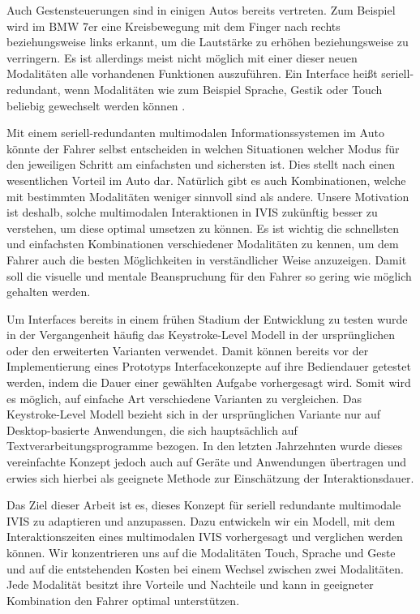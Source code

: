 Auch Gestensteuerungen sind in einigen Autos bereits vertreten.
Zum Beispiel wird im BMW 7er eine Kreisbewegung mit dem Finger nach rechts beziehungsweise links erkannt, um die Lautstärke zu erhöhen beziehungsweise zu verringern. 
Es ist allerdings meist nicht möglich mit einer dieser neuen Modalitäten alle vorhandenen Funktionen auszuführen.
Ein Interface heißt seriell-redundant, wenn Modalitäten wie zum Beispiel Sprache, Gestik oder Touch beliebig gewechselt werden können \citep{neuss_2001}. 

Mit einem seriell-redundanten multimodalen Informationssystemen im Auto könnte der Fahrer selbst entscheiden in welchen Situationen welcher Modus für den jeweiligen Schritt am einfachsten und sichersten ist.
Dies stellt nach \citet{Muller_2011} einen wesentlichen Vorteil im Auto dar.
Natürlich gibt es auch Kombinationen, welche mit bestimmten Modalitäten weniger sinnvoll sind als andere.
Unsere Motivation ist deshalb, solche multimodalen Interaktionen in IVIS zukünftig besser zu verstehen, um diese optimal umsetzen zu können.
Es ist wichtig die schnellsten und einfachsten Kombinationen verschiedener Modalitäten zu kennen, um dem Fahrer auch die besten Möglichkeiten in verständlicher Weise anzuzeigen.
Damit soll die visuelle und mentale Beanspruchung für den Fahrer so gering wie möglich gehalten werden. 

Um Interfaces bereits in einem frühen Stadium der Entwicklung zu testen wurde in der Vergangenheit häufig das Keystroke-Level Modell in der ursprünglichen oder den erweiterten Varianten verwendet.
Damit können bereits vor der Implementierung eines Prototyps Interfacekonzepte auf ihre Bediendauer getestet werden, indem die Dauer einer gewählten Aufgabe vorhergesagt wird.
Somit wird es möglich, auf einfache Art verschiedene Varianten zu vergleichen.
Das Keystroke-Level Modell bezieht sich in der ursprünglichen Variante nur auf Desktop-basierte Anwendungen, die sich hauptsächlich auf Textverarbeitungsprogramme bezogen.
In den letzten Jahrzehnten wurde dieses vereinfachte Konzept jedoch auch auf Geräte und Anwendungen übertragen und erwies sich hierbei als geeignete Methode zur Einschätzung der Interaktionsdauer. 

Das Ziel dieser Arbeit ist es, dieses Konzept für seriell redundante multimodale IVIS zu adaptieren und anzupassen.
Dazu entwickeln wir ein Modell, mit dem Interaktionszeiten eines multimodalen IVIS vorhergesagt und verglichen werden können.
Wir konzentrieren uns auf die Modalitäten Touch, Sprache und Geste und auf die entstehenden Kosten bei einem Wechsel zwischen zwei Modalitäten.
Jede Modalität besitzt ihre Vorteile und Nachteile und kann in geeigneter Kombination den Fahrer optimal unterstützen.

